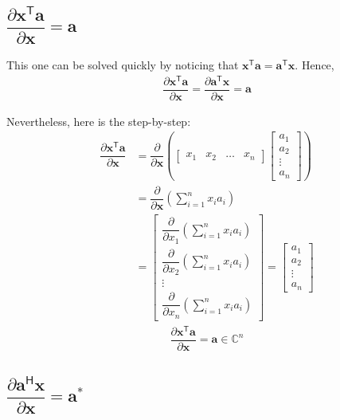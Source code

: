 \documentclass{article}
\newcommand{\trans}{\mathsf{T}}
\newcommand{\hermit}{\mathsf{H}}
\begin{document}
\subsection{\(\dfrac{\partial \mathbf{x}^\trans  \mathbf{a}}{\partial \mathbf{x}} = \mathbf{a}\)}

This one can be solved quickly by noticing that \(\mathbf{x}^\trans  \mathbf{a} = \mathbf{a}^\trans  \mathbf{x}\). Hence,
\begin{align}
    \dfrac{\partial \mathbf{x}^\trans  \mathbf{a}}{\partial \mathbf{x}} = \dfrac{\partial \mathbf{a}^\trans  \mathbf{x}}{\partial \mathbf{x}} = \mathbf{a}
\end{align}

Nevertheless, here is the step-by-step:
\begin{align}
    \dfrac{\partial \mathbf{x}^\trans \mathbf{a}}{\partial \mathbf{x}} &= \dfrac{\partial}{\partial \mathbf{x}} \left(
    \begin{bmatrix}
        x_1 & x_2 & \dots & x_n
    \end{bmatrix} \begin{bmatrix}
        a_{1} \\ a_{2} \\ \vdots \\ a_{n}
    \end{bmatrix} \right) \\
    & = \dfrac{\partial}{\partial \mathbf{x}} \left( \sum_{i = 1}^n x_ia_i \right) \\
    & = \begin{bmatrix}
        \dfrac{\partial}{\partial x_1} \left( \sum_{i = 1}^n x_ia_i \right) \\ \dfrac{\partial}{\partial x_2} \left( \sum_{i = 1}^n x_ia_i \right) \\ \vdots \\ \dfrac{\partial}{\partial x_n} \left( \sum_{i = 1}^n x_ia_i \right) 
    \end{bmatrix} 
    = \begin{bmatrix}
        a_1 \\ a_2 \\ \vdots \\ a_n
    \end{bmatrix}
\end{align}
\begin{align}
    \boxed{\dfrac{\partial \mathbf{x}^\trans \mathbf{a}}{\partial \mathbf{x}} = \mathbf{a} \in \mathbb{C}^{n}}
\end{align}

\subsection{\(\dfrac{\partial \mathbf{a}^\hermit  \mathbf{x}}{\partial \mathbf{x}} = \mathbf{a}^*\)}
\end{document}
